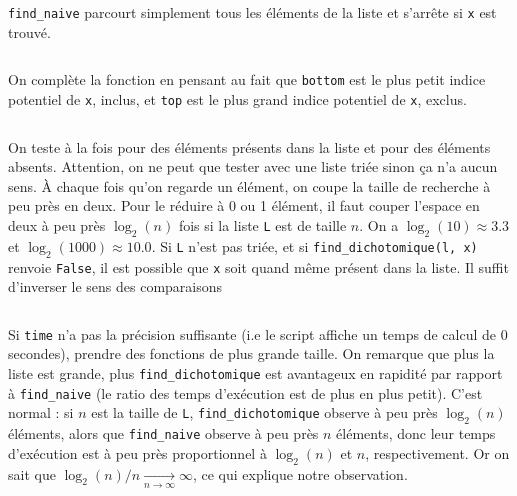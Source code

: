 \begin{correction}
	\quessques \texttt{find\_naive} parcourt simplement tous les éléments de la liste et s'arrête si \texttt{x} est trouvé.
	\inputminted{python}{minted/9/find_naive_correction.py}
	\quessques On complète la fonction en pensant au fait que \texttt{bottom} est le plus petit indice potentiel de \texttt{x}, inclus, et \texttt{top} est le plus grand indice potentiel de \texttt{x}, exclus.
	\inputminted{python}{minted/9/find_dichotomique_correction.py}
	\ssques On teste à la fois pour des éléments présents dans la liste et pour des éléments absents. Attention, on ne peut que tester avec une liste triée sinon ça n'a aucun sens.
	\ssques À chaque fois qu'on regarde un élément, on coupe la taille de recherche à peu près en deux. Pour le réduire à 0 ou 1 élément, il faut couper l'espace en deux à peu près $ \log_2(n) $ fois si la liste \texttt{L} est de taille $ n $. On a $ \log_2(10) \approx 3.3$ et $ \log_2(1000) \approx 10.0 $.
	\ssques Si \texttt{L} n'est pas triée, et si \texttt{find\_dichotomique(l, x)} renvoie \texttt{False}, il est possible que \texttt{x} soit quand même présent dans la liste.
	\ssques Il suffit d'inverser le sens des comparaisons
	\inputminted{python}{minted/9/find_dichotomique_decrease_correction.py}

	\quessques Si \texttt{time} n'a pas la précision suffisante (i.e le script affiche un temps de calcul de $ 0 $ secondes), prendre des fonctions de plus grande taille.
	\ssques On remarque que plus la liste est grande, plus \texttt{find\_dichotomique} est avantageux en rapidité par rapport à \texttt{find\_naive} (le ratio des temps d'exécution est de plus en plus petit). C'est normal : si $ n $ est la taille de \texttt{L}, \texttt{find\_dichotomique} observe à peu près $ \log_2(n) $ éléments, alors que \texttt{find\_naive} observe à peu près $ n $ éléments, donc leur temps d'exécution est à peu près proportionnel à $ \log_2(n) $ et $ n $, respectivement. Or on sait que $ \log_2(n) / n \underset{n \rightarrow \infty}{\rightarrow} \infty $, ce qui explique notre observation.

\end{correction}

